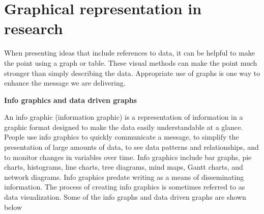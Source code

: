\chapter{\textbf{Graphical representation in research}}


When presenting ideas that include references to data, it can be helpful to make the point using a graph or table. These visual methods can make the point much stronger than simply describing the data. Appropriate use of graphs is one way to enhance the message we are delivering.

\textbf{ Info graphics and data driven graphs}\cite {Shelley Fishel}

An info graphic (information graphic) is a representation of information in a graphic format designed to make the data easily understandable at a glance. People use info graphics to quickly communicate a message, to simplify the presentation of large amounts of data, to see data patterns and relationships, and to monitor changes in variables over time.
Info graphics include bar graphs, pie charts, histograms, line charts, tree diagrams, mind maps, Gantt charts, and network diagrams. Info graphics predate writing as a means of disseminating information. The process of creating info graphics is sometimes referred to as data visualization.
Some of the info graphs and data driven graphs are shown below

